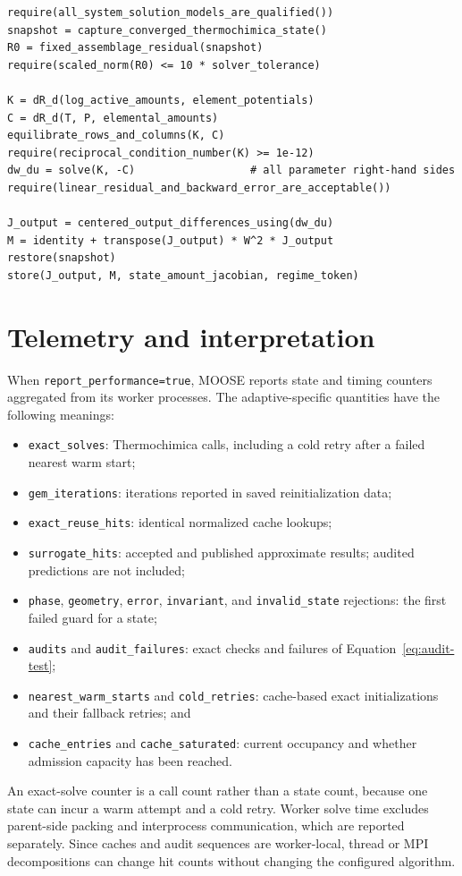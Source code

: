 \documentclass[11pt]{article}
\newcommand{\code}[1]{\texttt{#1}}
\begin{document}
\begin{lstlisting}[caption={Construction of a fixed-assemblage KKT cache record.},
label={lst:kkt-construction}]
require(all_system_solution_models_are_qualified())
snapshot = capture_converged_thermochimica_state()
R0 = fixed_assemblage_residual(snapshot)
require(scaled_norm(R0) <= 10 * solver_tolerance)

K = dR_d(log_active_amounts, element_potentials)
C = dR_d(T, P, elemental_amounts)
equilibrate_rows_and_columns(K, C)
require(reciprocal_condition_number(K) >= 1e-12)
dw_du = solve(K, -C)                  # all parameter right-hand sides
require(linear_residual_and_backward_error_are_acceptable())

J_output = centered_output_differences_using(dw_du)
M = identity + transpose(J_output) * W^2 * J_output
restore(snapshot)
store(J_output, M, state_amount_jacobian, regime_token)
\end{lstlisting}

\clearpage

\section{Telemetry and interpretation}

When \code{report\_performance=true}, MOOSE reports state and timing counters aggregated from its
worker processes.  The adaptive-specific quantities have the following meanings:
\begin{itemize}[leftmargin=*]
  \item \code{exact\_solves}: Thermochimica calls, including a cold retry after a failed nearest
  warm start;
  \item \code{gem\_iterations}: iterations reported in saved reinitialization data;
  \item \code{exact\_reuse\_hits}: identical normalized cache lookups;
  \item \code{surrogate\_hits}: accepted and published approximate results; audited predictions
  are not included;
  \item \code{phase}, \code{geometry}, \code{error}, \code{invariant}, and
  \code{invalid\_state} rejections: the first failed guard for a state;
  \item \code{audits} and \code{audit\_failures}: exact checks and failures of
  Equation~\eqref{eq:audit-test};
  \item \code{nearest\_warm\_starts} and \code{cold\_retries}: cache-based exact initializations
  and their fallback retries; and
  \item \code{cache\_entries} and \code{cache\_saturated}: current occupancy and whether admission
  capacity has been reached.
\end{itemize}
An exact-solve counter is a call count rather than a state count, because one state can incur a
warm attempt and a cold retry.  Worker solve time excludes parent-side packing and interprocess
communication, which are reported separately.  Since caches and audit sequences are worker-local,
thread or MPI decompositions can change hit counts without changing the configured algorithm.
\end{document}
